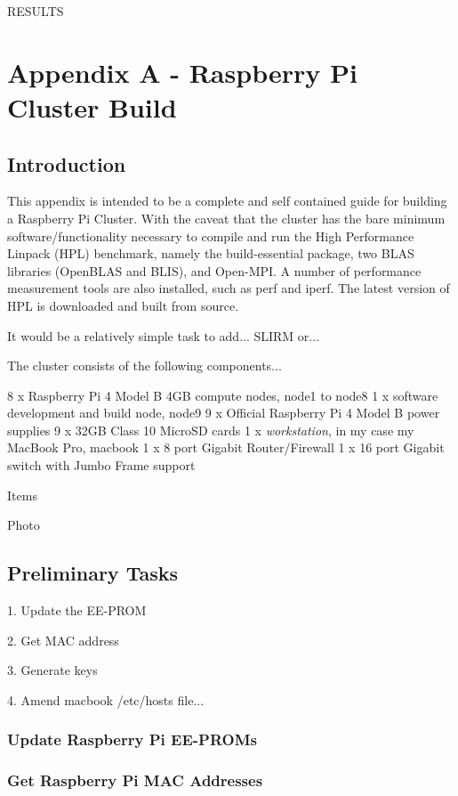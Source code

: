\documentclass{article}
\begin{document}
RESULTS


%
%
\clearpage\section{Appendix A - Raspberry Pi Cluster Build}

\subsection{Introduction}

This appendix is intended to be a complete and self contained guide for building a Raspberry Pi Cluster. With the caveat that the cluster has the bare minimum software/functionality necessary to compile and run the High Performance Linpack (HPL) benchmark, namely the build-essential package, two BLAS libraries (OpenBLAS and BLIS), and Open-MPI. A number of performance measurement tools are also installed, such as perf and iperf. The latest version of HPL is downloaded and built from source.

It would be a relatively simple task to add... SLIRM or...

The cluster consists of the following components...

8 x Raspberry Pi 4 Model B 4GB compute nodes, node1 to node8
1 x software development and build node, node9
9 x Official Raspberry Pi 4 Model B power supplies
9 x 32GB Class 10 MicroSD cards
1 x \emph{workstation}, in my case my MacBook Pro, macbook
1 x 8 port Gigabit Router/Firewall
1 x 16 port Gigabit switch with Jumbo Frame support

Items

Photo


\subsection{Preliminary Tasks}

1. Update the EE-PROM

2. Get MAC address

3. Generate keys

4. Amend macbook /etc/hosts file...



\subsubsection{Update Raspberry Pi EE-PROMs}



\subsubsection{Get Raspberry Pi MAC Addresses}
\end{document}
